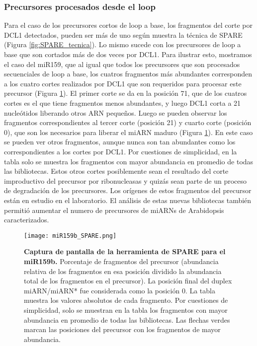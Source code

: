 \subsubsection{Precursores procesados desde el loop}

Para el caso de los precursores cortos de loop a base, los fragmentos del corte por DCL1 detectados, pueden ser más de uno según muestra la técnica de SPARE (Figura \ref{fig:SPARE_tecnica}).
Lo mismo sucede con los precursores de loop a base que son cortados más de dos veces por DCL1.
Para ilustrar esto, mostramos  el caso del miR159, que al igual que todos los precursores que son procesados secuenciales de loop a base, los cuatros fragmentos más abundantes corresponden a los cuatro cortes realizados por DCL1 que son requeridos para procesar este precursor (Figura \ref{fig:miR159b_SPARE}).
El primer corte se da en la posición 71, que de los cuatros cortes es el que tiene fragmentos menos abundantes, y luego DCL1 corta a 21 nucleótidos liberando otros ARN pequeños.
Luego se pueden observar los fragmentos correspondientes al tercer corte (posición 21) y cuarto corte (posición 0), que son los necesarios para liberar el miARN maduro (Figura \ref{fig:miR159b_SPARE}).
En este caso se pueden ver otros fragmentos, aunque nunca son tan abundantes como los correspondientes a los cortes por DCL1.
Por cuestiones de simplicidad, en la tabla solo se muestra los fragmentos con mayor abundancia en promedio de todas las bibliotecas.
Estos otros cortes posiblemente sean el resultado del corte improductivo del precursor por ribonucleasas y quizás sean parte de un proceso de degradación de los precursores.
Los orígenes de estos fragmentos del precursor están en estudio en el laboratorio.
El análisis de estas nuevas bibliotecas también permitió aumentar el numero de precursores de miARNs de Arabidopsis caracterizados.

\begin{landscape}
    \begin{figure}[htbp!] 
        \centering    
        \texttt{[image: miR159b\_SPARE.png]}
		\caption[Captura de pantalla de la herramienta de SPARE para el miR159b]{
        \textbf{Captura de pantalla de la herramienta de SPARE para el miR159b.}
        Porcentaje de fragmentos del precursor (abundancia relativa de los fragmentos en esa posición dividido la abundancia total de los fragmentos en el precursor).
        La posición final del duplex miARN/miARN* fue considerada como la posición 0.
        La tabla muestra los valores absolutos de cada fragmento.
        Por cuestiones de simplicidad, solo se muestran en la tabla los fragmentos con mayor abundancia en promedio de todas las bibliotecas.
        Las flechas verdes marcan las posiciones del precursor con los fragmentos de mayor abundancia.
        }
		\label{fig:miR159b_SPARE}
    \end{figure}
\end{landscape}


